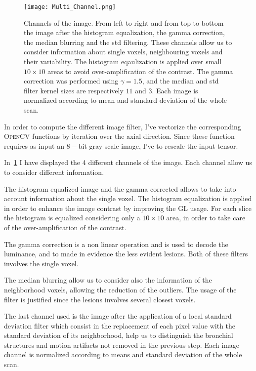 		\begin{figure}[h]
			\centering
				\texttt{[image: Multi\_Channel.png]}
			\caption{Channels of the image. From left to right and from top to bottom the image after the histogram equalization, the gamma correction, the median blurring and the std filtering. These channels allow us to consider information about single voxels, neighbouring voxels and their variability. The histogram eqaulization is applied over small $10\times 10$ areas to avoid  over-amplification of the contrast. The gamma correction was performed using $\gamma = 1.5$, and the median and std filter kernel sizes are respectively $11$ and $3$. Each image is normalized according to mean and standard deviation of the whole scan. }\label{fig:MultiChannel}
		\end{figure}
	
		In order to compute the different image filter, I've vectorize the corresponding \textsc{OpenCV} functions by iteration over the axial direction. Since these function requires as input an $8-$bit gray scale image, I've to rescale the input tensor.
	
		In \figurename\,\ref{fig:MultiChannel} I have displayed the 4 different channels of the image. Each channel allow us to consider different information.
		
		The histogram equalized image and the gamma corrected allows to take into account information about the single voxel. The histogram equalization is applied in order to enhance the image contrast by improving the GL usage. For each slice the histogram is equalized considering only a $10\times 10$ area, in order to take care of the over-amplification of the contrast.
		
		The gamma correction is a non linear operation and is used to decode the luminance, and to made in evidence the less evident lesions. Both of these filters involves the single voxel.
		
		The median blurring allow us to consider also the information of the neighborhood voxels, allowing the reduction of the outliers. The usage of the filter is justified since the lesions involves several closest voxels.
		 
		The last channel used is the image after the application of a local standard deviation filter which consist in the replacement of each pixel value with the standard deviation of its neighborhood, help us to distinguish the bronchial structures and motion artifacts not removed in the previous step.	
		Each image channel is normalized according to means and standard deviation of the whole scan.
		
